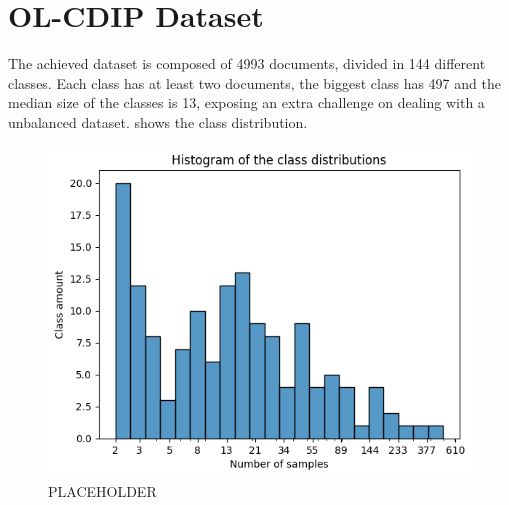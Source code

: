 



\section{OL-CDIP Dataset}
\label{sec:dataset}

The achieved dataset is composed of 4993 documents, divided in 144 different classes. Each class has at least two documents, the biggest class has 497 and the median size of the classes is 13, exposing an extra challenge on dealing with a unbalanced dataset.  shows the class distribution.

\begin{figure}[htbp]
\centering
\includegraphics[width=.8\textwidth]{images/histplot.png}
\caption{PLACEHOLDER}
\label{fig:histplot}
\end{figure}  

